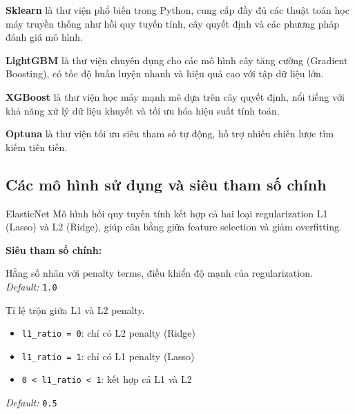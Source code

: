 \documentclass[12pt,a4paper]{article}
\newenvironment{methodlist}{
    \begin{description}[style=nextline, font=\ttfamily\color{sklearn-blue}]
}{
    \end{description}
}
\begin{document}
\textbf{Sklearn} là thư viện phổ biến trong Python, cung cấp đầy đủ các thuật toán học máy truyền thống như hồi quy tuyến tính, cây quyết định và các phương pháp đánh giá mô hình. 

\textbf{LightGBM} là thư viện chuyên dụng cho các mô hình cây tăng cường (Gradient Boosting), có tốc độ huấn luyện nhanh và hiệu quả cao với tập dữ liệu lớn. 

\textbf{XGBoost} là thư viện học máy mạnh mẽ dựa trên cây quyết định, nổi tiếng với khả năng xử lý dữ liệu khuyết và tối ưu hóa hiệu suất tính toán.

\textbf{Optuna} là thư viện tối ưu siêu tham số tự động, hỗ trợ nhiều chiến lược tìm kiếm tiên tiến.

\subsection{Các mô hình sử dụng và siêu tham số chính}

\begin{modelbox}{ElasticNet}
Mô hình hồi quy tuyến tính kết hợp cả hai loại regularization L1 (Lasso) và L2 (Ridge), giúp cân bằng giữa feature selection và giảm overfitting.

\vspace{0.2cm}
\textbf{Siêu tham số chính:}
\begin{methodlist}
    \item[alpha] 
    Hằng số nhân với penalty terms, điều khiển độ mạnh của regularization. \\ 
    \textit{Default:} \texttt{1.0}
    
    \item[l1\_ratio] 
    Tỉ lệ trộn giữa L1 và L2 penalty. 
    \begin{itemize}[leftmargin=1.5em]
        \item \texttt{l1\_ratio = 0}: chỉ có L2 penalty (Ridge)
        \item \texttt{l1\_ratio = 1}: chỉ có L1 penalty (Lasso)
        \item \texttt{0 < l1\_ratio < 1}: kết hợp cả L1 và L2
    \end{itemize}
    \textit{Default:} \texttt{0.5}
\end{methodlist}
\end{modelbox}
\end{document}
